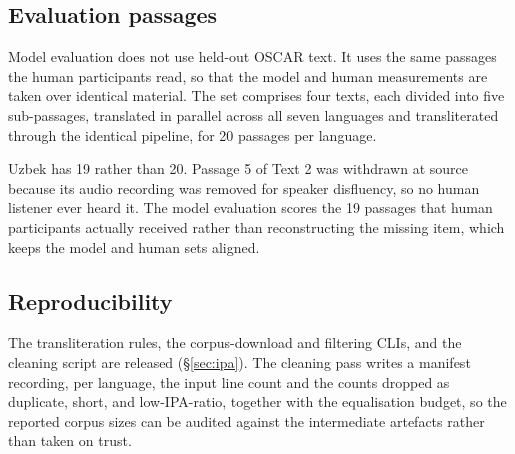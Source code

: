 \subsection{Evaluation passages}
\label{sec:data-eval}

Model evaluation does not use held-out OSCAR text. It uses the same passages the human participants read, so that the model and human measurements are taken over identical material. The set comprises four texts, each divided into five sub-passages, translated in parallel across all seven languages and transliterated through the identical pipeline, for 20 passages per language.

Uzbek has 19 rather than 20. Passage 5 of Text 2 was withdrawn at source because its audio recording was removed for speaker disfluency, so no human listener ever heard it. The model evaluation scores the 19 passages that human participants actually received rather than reconstructing the missing item, which keeps the model and human sets aligned.

\subsection{Reproducibility}
\label{sec:data-repro}

The transliteration rules, the corpus-download and filtering CLIs, and the cleaning script are released (\S\ref{sec:ipa}). The cleaning pass writes a manifest recording, per language, the input line count and the counts dropped as duplicate, short, and low-IPA-ratio, together with the equalisation budget, so the reported corpus sizes can be audited against the intermediate artefacts rather than taken on trust.

%
%
%
%
